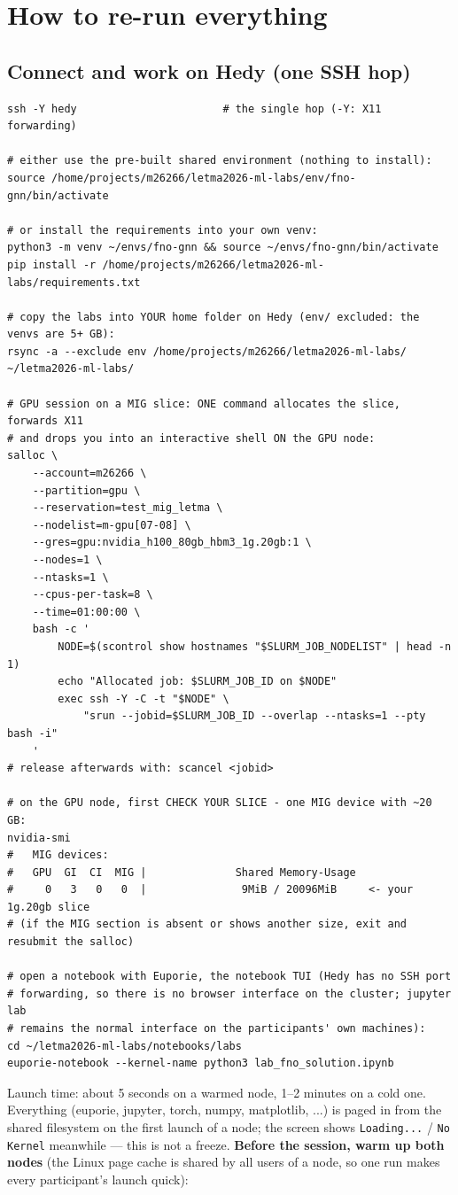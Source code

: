 \documentclass[11pt,a4paper]{article}
\begin{document}
\section{How to re-run everything}

\subsection*{Connect and work on Hedy (one SSH hop)}
\begin{lstlisting}
ssh -Y hedy                       # the single hop (-Y: X11 forwarding)

# either use the pre-built shared environment (nothing to install):
source /home/projects/m26266/letma2026-ml-labs/env/fno-gnn/bin/activate

# or install the requirements into your own venv:
python3 -m venv ~/envs/fno-gnn && source ~/envs/fno-gnn/bin/activate
pip install -r /home/projects/m26266/letma2026-ml-labs/requirements.txt

# copy the labs into YOUR home folder on Hedy (env/ excluded: the venvs are 5+ GB):
rsync -a --exclude env /home/projects/m26266/letma2026-ml-labs/ ~/letma2026-ml-labs/

# GPU session on a MIG slice: ONE command allocates the slice, forwards X11
# and drops you into an interactive shell ON the GPU node:
salloc \
    --account=m26266 \
    --partition=gpu \
    --reservation=test_mig_letma \
    --nodelist=m-gpu[07-08] \
    --gres=gpu:nvidia_h100_80gb_hbm3_1g.20gb:1 \
    --nodes=1 \
    --ntasks=1 \
    --cpus-per-task=8 \
    --time=01:00:00 \
    bash -c '
        NODE=$(scontrol show hostnames "$SLURM_JOB_NODELIST" | head -n 1)
        echo "Allocated job: $SLURM_JOB_ID on $NODE"
        exec ssh -Y -C -t "$NODE" \
            "srun --jobid=$SLURM_JOB_ID --overlap --ntasks=1 --pty bash -i"
    '
# release afterwards with: scancel <jobid>

# on the GPU node, first CHECK YOUR SLICE - one MIG device with ~20 GB:
nvidia-smi
#   MIG devices:
#   GPU  GI  CI  MIG |              Shared Memory-Usage
#     0   3   0   0  |               9MiB / 20096MiB     <- your 1g.20gb slice
# (if the MIG section is absent or shows another size, exit and resubmit the salloc)

# open a notebook with Euporie, the notebook TUI (Hedy has no SSH port
# forwarding, so there is no browser interface on the cluster; jupyter lab
# remains the normal interface on the participants' own machines):
cd ~/letma2026-ml-labs/notebooks/labs
euporie-notebook --kernel-name python3 lab_fno_solution.ipynb
\end{lstlisting}
Launch time: about 5 seconds on a warmed node, 1--2 minutes on a cold one.
Everything (euporie, jupyter, torch, numpy, matplotlib, ...) is paged in from the shared
filesystem on the first launch of a node; the screen shows \texttt{Loading...} /
\texttt{No Kernel} meanwhile --- this is not a freeze. \textbf{Before the session, warm up
both nodes} (the Linux page cache is shared by all users of a node, so one run makes every
participant's launch quick):
\end{document}
